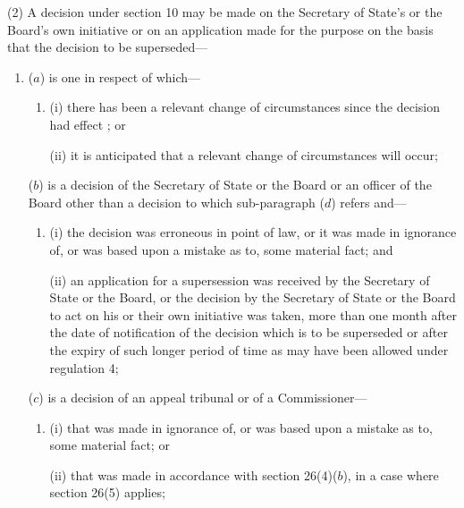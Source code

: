 \documentclass[12pt,a4paper]{article}
\begin{document}
(2) A decision under section 10 may be made on the Secretary of State’s 
or the Board's  %
own initiative or on an application made for the purpose on the basis that the decision to be superseded—
\begin{enumerate}\item[]
($a$) is one in respect of which—
\begin{enumerate}\item[]
(i) there has been a relevant change of circumstances since the decision 
had effect%
; or

(ii) it is anticipated that a relevant change of circumstances will occur;
\end{enumerate}

($b$) is a decision of the Secretary of State 
or the Board or an officer of the Board  %
other than a decision to which sub-paragraph ($d$) refers and—
\begin{enumerate}\item[]
(i) the decision was erroneous in point of law, or it was made in ignorance of, or was based upon a mistake as to, some material fact; and

(ii) an application for a supersession was received by the Secretary of State
or the Board,  %
or the decision by the Secretary of State 
or the Board  %
to act on his 
or their  %
own initiative was taken, more than one month after the date of notification of the decision which is to be superseded or after the expiry of such longer period of time as may have been allowed under regulation 4;
\end{enumerate}


($c$) is a decision of an appeal tribunal or of a Commissioner—
\begin{enumerate}\item[]
(i) that was made in ignorance of, or was based upon a mistake as to, some material fact; or

(ii) that was made in accordance with section 26(4)($b$), in a case where section 26(5) applies;
\end{enumerate}


\end{enumerate}
\end{document}
